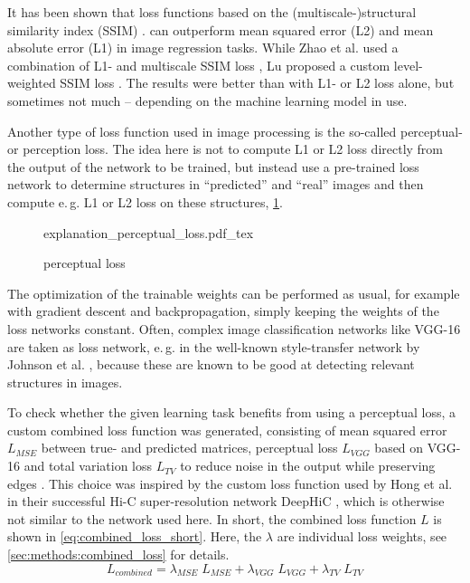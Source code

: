 It has been shown that loss functions based on the (multiscale-)structural similarity index (SSIM) \cite{Wang2003}. 
can outperform mean squared error (L2) and mean absolute error (L1) in image regression tasks.
While Zhao et al. used a combination of L1- and multiscale SSIM loss \cite{Zhao2017},
Lu proposed a custom level-weighted SSIM loss \cite{Lu2019}.
The results were better than with L1- or L2 loss alone, but sometimes not much -- depending on the machine learning model in use.

Another type of loss function used in image processing is the so-called perceptual- or perception loss.
The idea here is not to compute L1 or L2 loss directly from the output of the network to be trained,
but instead use a pre-trained loss network to determine structures in ``predicted'' and ``real'' images
and then compute e.\,g. L1 or L2 loss on these structures, \cref{fig:improve:perceptual_loss}.
\begin{figure}[htb]
    \small
    \centering
    {explanation_perceptual_loss.pdf_tex}%
    \caption{perceptual loss}
    \label{fig:improve:perceptual_loss}
\end{figure}
The optimization of the trainable weights can be performed as usual, for example with gradient descent and backpropagation, 
simply keeping the weights of the loss networks constant.
Often, complex image classification networks like VGG-16 \cite{Simonyan2015} are taken as loss network, e.\,g. in the well-known style-transfer network by Johnson et al. \cite{Johnson2016},
because these are known to be good at detecting relevant structures in images.

To check whether the given learning task benefits from using a perceptual loss, a custom combined loss function was generated,
consisting of mean squared error $L_\mathit{MSE}$ between true- and predicted matrices, perceptual loss $L_\mathit{VGG}$ based on VGG-16 and 
total variation loss $L_\mathit{TV}$ to reduce noise in the output while preserving edges \cite{Rudin1992}. 
This choice was inspired by the custom loss function used by Hong et al. in their successful Hi-C super-resolution network DeepHiC \cite{Hong2020},
which is otherwise not similar to the network used here.
In short, the combined loss function $L$ is shown in \cref{eq:combined_loss_short}. Here, the $\lambda$ are individual loss weights, see \cref{sec:methods:combined_loss} for details.
\begin{equation}
 L_\mathit{combined} = \lambda_\mathit{MSE} \; L_\mathit{MSE} + \lambda_\mathit{VGG} \; L_\mathit{VGG} + \lambda_\mathit{TV} \; L_\mathit{TV} \label{eq:combined_loss_short}
\end{equation}

